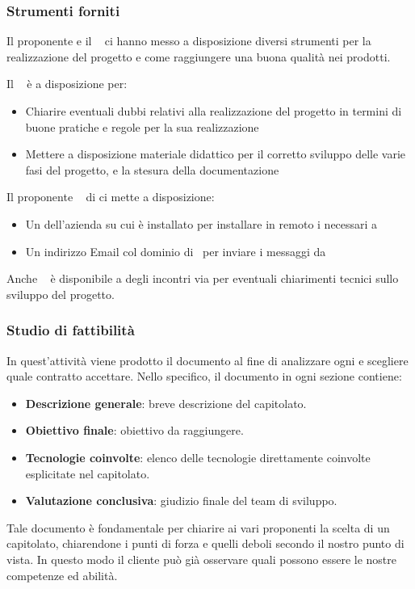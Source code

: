         \subsubsection{Strumenti forniti}
        Il proponente e il \TV~ ci hanno messo a disposizione diversi strumenti per la realizzazione del progetto e come raggiungere una buona qualità nei prodotti. \par
        Il \TV~ è a disposizione per:
        \begin{itemize}
            \item Chiarire eventuali dubbi relativi alla realizzazione del progetto in termini di buone pratiche e regole per la sua realizzazione
            \item Mettere a disposizione materiale didattico per il corretto sviluppo delle varie fasi del progetto, e la stesura della documentazione
        \end{itemize}
        Il proponente \DZ~ di \II ci mette a disposizione:
        \begin{itemize}
            \item Un  dell'azienda su cui è installato  per installare in remoto i  necessari a \progetto
            \item Un indirizzo Email col dominio di \II~per inviare i messaggi da \progetto
        \end{itemize}
        Anche \DZ~ è disponibile a degli incontri via  per eventuali chiarimenti tecnici sullo sviluppo del progetto.

        \subsubsection{Studio di fattibilità}\label{PP:Fornitura:SdF}
        In quest'attività viene prodotto il documento \Doc{\SdFv} al fine di analizzare ogni  e scegliere quale contratto accettare.
        Nello specifico, il documento in ogni sezione contiene:
        	\begin{itemize}
        		\item \textbf{Descrizione generale}: breve descrizione del capitolato.
        		\item \textbf{Obiettivo finale}: obiettivo da raggiungere.
        		\item \textbf{Tecnologie coinvolte}: elenco delle tecnologie direttamente coinvolte esplicitate nel capitolato.
        		\item \textbf{Valutazione conclusiva}: giudizio finale del team di sviluppo.
        	\end{itemize}
        Tale documento è fondamentale per chiarire ai vari proponenti la scelta di un capitolato, chiarendone i punti di forza e quelli deboli secondo il nostro punto di vista. In questo modo il cliente può già osservare quali possono essere le nostre competenze ed abilità.
        
